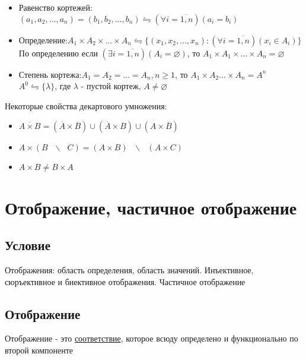 \documentclass{report}
\newcommand{\bslash}{\mbox{ } \backslash \mbox{ }}
\begin{document}
\begin{itemize}
    \item Равенство кортежей:\newline$(a_1,a_2,\ldots,a_n) = (b_1, b_2,\ldots,b_n) \leftrightharpoons (\forall i = \overline{1,n})(a_i = b_i)$
    \item Определение:\newline$A_1 \times A_2 \times \ldots \times A_n \leftrightharpoons \{(x_1, x_2, \ldots, x_n):(\forall i = \overline{1,n})(x_i \in A_i)\}$\newline
          По определению если $(\exists i = \overline{1,n})(A_i = \varnothing)$, то $A_1 \times A_1 \times \ldots \times A_n = \varnothing$
    \item Степень кортежа: $A_1 = A_2 = \ldots = A_n, n \geq 1$, то $A_1 \times A_2 \ldots \times A_n = A^n$\newline
          $A^0 \leftrightharpoons \{\lambda\}$, где $\lambda$ - пустой кортеж, $A \neq \varnothing$
\end{itemize}

Некоторые свойства декартового умножения:
\begin{itemize}
    \item $\overline{A \times B} = (\overline{A} \times \overline{B}) \cup (\overline{A} \times B) \cup (A \times \overline{B})$
    \item $A \times (B \bslash C) = (A \times B) \bslash (A \times C)$
    \item $A \times B \neq B \times A$
\end{itemize}
\newpage

\section{Отображение, частичное отображение}
\subsection{Условие}
Отображения: область определения, область значений. Инъективное, сюръективное и биективное отображения. Частичное отображение

\subsection{Отображение}
Отображение - это \underline{соответствие}, которое всюду определено и функционально по второй компоненте

\medskip
\end{document}
